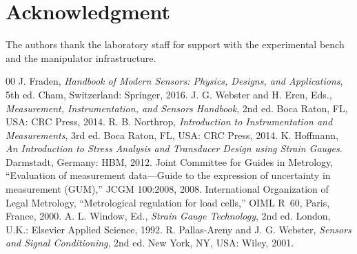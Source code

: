 \documentclass[conference]{IEEEtran}
\begin{document}
\section*{Acknowledgment}
The authors thank the laboratory staff for support with the experimental bench and the manipulator infrastructure.

\begin{thebibliography}{00}
 J. Fraden, \textit{Handbook of Modern Sensors: Physics, Designs, and Applications}, 5th ed. Cham, Switzerland: Springer, 2016.
 J. G. Webster and H. Eren, Eds., \textit{Measurement, Instrumentation, and Sensors Handbook}, 2nd ed. Boca Raton, FL, USA: CRC Press, 2014.
 R. B. Northrop, \textit{Introduction to Instrumentation and Measurements}, 3rd ed. Boca Raton, FL, USA: CRC Press, 2014.
 K. Hoffmann, \textit{An Introduction to Stress Analysis and Transducer Design using Strain Gauges}. Darmstadt, Germany: HBM, 2012.
 Joint Committee for Guides in Metrology, ``Evaluation of measurement data---Guide to the expression of uncertainty in measurement (GUM),'' JCGM 100:2008, 2008.
 International Organization of Legal Metrology, ``Metrological regulation for load cells,'' OIML R~60, Paris, France, 2000.
 A. L. Window, Ed., \textit{Strain Gauge Technology}, 2nd ed. London, U.K.: Elsevier Applied Science, 1992.
 R. Pallas-Areny and J. G. Webster, \textit{Sensors and Signal Conditioning}, 2nd ed. New York, NY, USA: Wiley, 2001.
\end{thebibliography}
\end{document}
